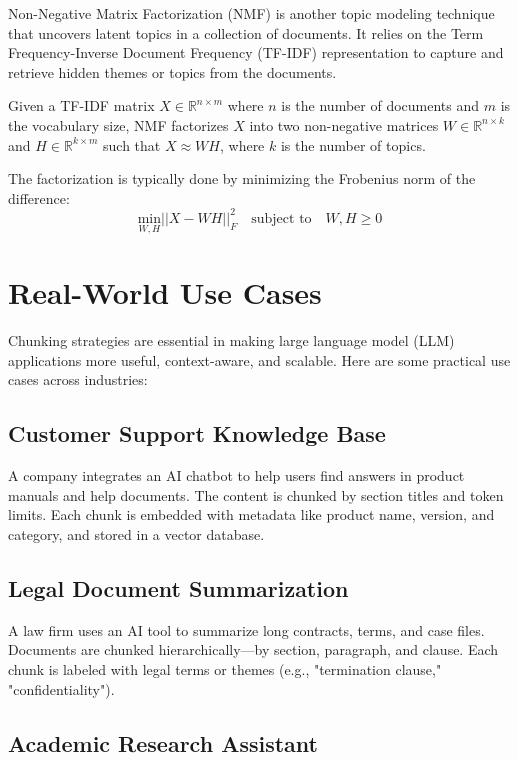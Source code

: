 \documentclass{article}
\begin{document}
Non-Negative Matrix Factorization (NMF) is another topic modeling technique that uncovers latent topics in a collection of documents. It relies on the Term Frequency-Inverse Document Frequency (TF-IDF) representation to capture and retrieve hidden themes or topics from the documents.

Given a TF-IDF matrix $X \in \mathbb{R}^{n \times m}$ where $n$ is the number of documents and $m$ is the vocabulary size, NMF factorizes $X$ into two non-negative matrices $W \in \mathbb{R}^{n \times k}$ and $H \in \mathbb{R}^{k \times m}$ such that $X \approx WH$, where $k$ is the number of topics.

The factorization is typically done by minimizing the Frobenius norm of the difference:
\begin{equation}
\underset{W,H}{\textrm{min}} ||X - WH||_F^2 \quad \textrm{subject to} \quad W, H \geq 0
\end{equation}

\section{Real-World Use Cases}

Chunking strategies are essential in making large language model (LLM) applications more useful, context-aware, and scalable. Here are some practical use cases across industries:

\subsection{Customer Support Knowledge Base}

A company integrates an AI chatbot to help users find answers in product manuals and help documents. The content is chunked by section titles and token limits. Each chunk is embedded with metadata like product name, version, and category, and stored in a vector database.

\subsection{Legal Document Summarization}

A law firm uses an AI tool to summarize long contracts, terms, and case files. Documents are chunked hierarchically—by section, paragraph, and clause. Each chunk is labeled with legal terms or themes (e.g., "termination clause," "confidentiality").

\subsection{Academic Research Assistant}
\end{document}
